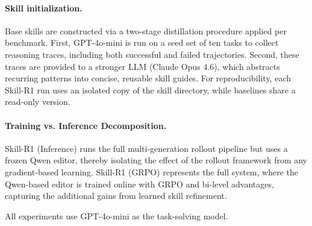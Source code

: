 \paragraph{Skill initialization.} 
Base skills are constructed via a two-stage distillation procedure applied per benchmark. First, GPT-4o-mini is run on a seed set of ten tasks to collect reasoning traces, including both successful and failed trajectories. Second, these traces are provided to a stronger LLM (Claude Opus 4.6), which abstracts recurring patterns into concise, reusable skill guides. For reproducibility, each Skill-R1 run uses an isolated copy of the skill directory, while baselines share a read-only version.
\paragraph{Training vs. Inference Decomposition.} Skill-R1 (Inference) runs the full multi-generation rollout pipeline but uses a frozen Qwen editor, thereby isolating the effect of the rollout framework from any gradient-based learning. Skill-R1 (GRPO) represents the full system, where the Qwen-based editor is trained online with GRPO and bi-level advantages, capturing the additional gains from learned skill refinement.

All experiments use GPT-4o-mini as the task-solving model. 

